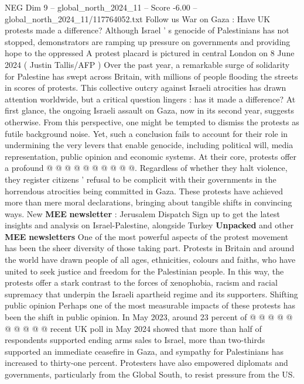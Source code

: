 \begin{textsample}{NEG Dim 9 – global\_north\_2024\_11 – Score -6.00 – global\_north\_2024\_11/117764052.txt}  \label{ex:f9_neg_051}
Follow us War on Gaza : Have UK protests made a difference?
Although Israel ' s genocide of Palestinians has not stopped, demonstrators are ramping up pressure on governments and providing hope to the oppressed A protest placard is pictured in central London on 8 June 2024 ( Justin Tallis/AFP ) Over the past year, a remarkable surge of solidarity for Palestine has swept across Britain, with millions of people flooding the streets in scores of protests.
This collective outcry against Israeli atrocities has drawn attention worldwide, but a critical question lingers : has it made a difference?
At first glance, the ongoing Israeli assault on Gaza, now in its second year, suggests otherwise.
From this perspective, one might be tempted to dismiss the protests as futile background noise.
Yet, such a conclusion fails to account for their role in undermining the very levers that enable genocide, including political will, media representation, public opinion and economic systems.
At their core, protests offer a profound @ @ @ @ @ @ @ @ @ @.
Regardless of whether they halt violence, they register citizens ' refusal to be complicit with their governments in the horrendous atrocities being committed in Gaza.
These protests have achieved more than mere moral declarations, bringing about tangible shifts in convincing ways.
New \textbf{MEE} \textbf{newsletter} : Jerusalem Dispatch Sign up to get the latest insights and analysis on Israel-Palestine, alongside Turkey \textbf{Unpacked} and other \textbf{MEE} \textbf{newsletters} One of the most powerful aspects of the protest movement has been the sheer diversity of those taking part.
Protests in Britain and around the world have drawn people of all ages, ethnicities, colours and faiths, who have united to seek justice and freedom for the Palestinian people.
In this way, the protests offer a stark contrast to the forces of xenophobia, racism and racial supremacy that underpin the Israeli apartheid regime and its supporters.
Shifting public opinion Perhaps one of the most measurable impacts of these protests has been the shift in public opinion.
In May 2023, around 23 percent of @ @ @ @ @ @ @ @ @ @ recent UK poll in May 2024 showed that more than half of respondents supported ending arms sales to Israel, more than two-thirds supported an immediate ceasefire in Gaza, and sympathy for Palestinians has increased to thirty-one percent.
Protesters have also empowered diplomats and governments, particularly from the Global South, to resist pressure from the US.

\end{textsample}
